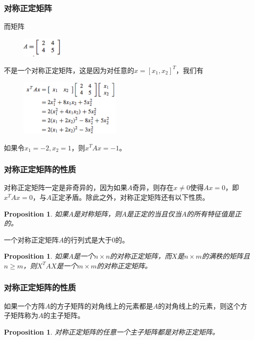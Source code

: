 \documentclass[10pt]{beamer}
\newtheorem{proposition}[theorem]{Proposition}
\begin{document}
\begin{frame}
\frametitle{对称正定矩阵}
而矩阵
\begin{figure}
\includegraphics[width=2cm]{figs/2_6_SPD-3} 
\end{figure}
不是一个对称正定矩阵，这是因为对任意的$x = [x_1, x_2]^T$，我们有
\begin{figure}
\includegraphics[width=5cm]{figs/2_6_SPD-4} 
\end{figure}
如果令$x_1 = -2, x_2 = 1$，则$x^{T}Ax = -1$。
\end{frame}


\begin{frame}
\frametitle{对称正定矩阵的性质}
对称正定矩阵一定是非奇异的，因为如果$A$奇异，则存在$x \neq 0$使得$Ax = 0$，即$x^{T} A x =0$，与$A$正定矛盾。除此之外，对称正定矩阵还有以下性质。

\begin{proposition}
如果$A$是对称矩阵，则$A$是正定的当且仅当$A$的所有特征值是正的。
\end{proposition}

\begin{corollary}
一个对称正定矩阵$A$的行列式是大于$0$的。
\end{corollary}

\begin{proposition}
如果$A$是一个$n\times n$的对称正定矩阵，而$X$是$n \times m$的满秩的矩阵且$n \ge m$，则$X^{T} A X$是一个$m \times m$的对称正定矩阵。
\end{proposition}
\end{frame}


\begin{frame}
\frametitle{对称正定矩阵的性质}
\begin{definition}
如果一个方阵$A$的方子矩阵的对角线上的元素都是$A$的对角线上的元素，则这个方子矩阵称为$A$的主子矩阵。
\end{definition}

\begin{proposition}
对称正定矩阵的任意一个主子矩阵都是对称正定矩阵。
\end{proposition}

\end{frame}
\end{document}
